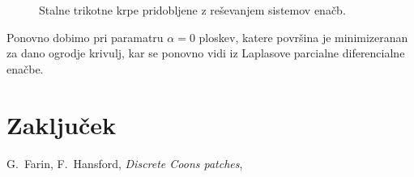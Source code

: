 \documentclass[a4paper,12pt]{article}
\begin{document}
\begin{figure}[ht!]
   \centering
   
   \caption{Stalne trikotne krpe pridobljene z reševanjem sistemov enačb.}
\label{fig:trikotne}
\end{figure}

Ponovno dobimo pri paramatru $\alpha = 0$ ploskev, 
katere površina je minimizeranan za dano ogrodje krivulj, kar se ponovno vidi iz 
Laplasove parcialne diferencialne enačbe.

\section{Zaključek}













\newpage


\newpage

\begin{thebibliography}{99}
   G.~Farin, F.~Hansford, \emph{Discrete Coons patches}, 
\end{thebibliography}
\end{document}
